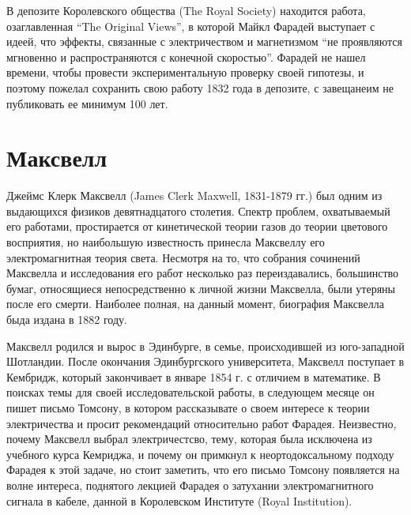 \documentclass[12pt, oneside, a4paper]{article}
\begin{document}
В депозите Королевского общества (The Royal Society) находится работа, озаглавленная ``The Original Views'', в которой Майкл Фарадей выступает с идеей, что эффекты, связанные с электричеством и магнетизмом ``не проявляются мгновенно и распространяются с конечной скоростью''. Фарадей не нашел времени, чтобы провести экспериментальную проверку своей гипотезы, и поэтому пожелал сохранить свою работу 1832 года в депозите, с завещанеим не публиковать ее минимум 100 лет.
\section*{Максвелл}
Джеймс Клерк Максвелл (James Clerk Maxwell, 1831-1879 гг.) был одним из выдающихся физиков девятнадцатого столетия. Спектр проблем, охватываемый его работами, простирается от кинетической теории газов до теории цветового восприятия, но наибольшую известность принесла Максвеллу его электромагнитная теория света. Несмотря на то, что собрания сочинений Максвелла и исследования его работ несколько раз переиздавались, большинство бумаг, относящиеся непосредственно к личной жизни Максвелла, были утеряны после его смерти. Наиболее полная, на данный момент, биография Максвелла быда издана в 1882 году.

Максвелл родился и вырос в Эдинбурге, в семье, происходившей из юго-западной Шотландии. После окончания Эдинбургского университета, Максвелл поступает в Кембридж, который закончивает в январе 1854 г. с отличием в математике. В поисках темы для своей исследовательской работы, в следующем месяце он пишет письмо Томсону, в котором рассказывате о своем интересе к теории электричества и просит рекомендаций относительно работ Фарадея. Неизвестно, почему Максвелл выбрал электричестсво, тему, которая была исключена из учебного курса Кемриджа, и почему он примкнул к неортодоксальному подходу Фарадея к этой задаче, но стоит заметить, что  его письмо Томсону появляется на волне интереса, поднятого лекцией Фарадея о затухании электромагнитного сигнала в кабеле, данной в Королевском Институте (Royal Institution). 
\end{document}
